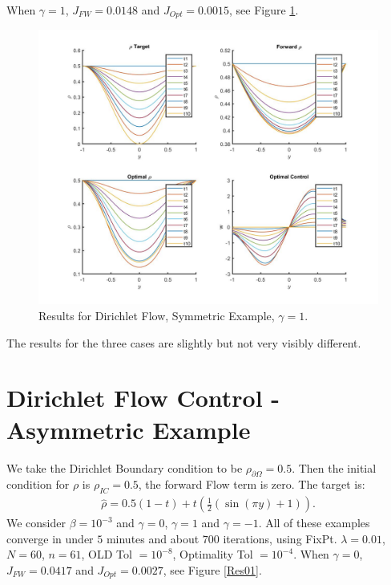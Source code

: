 \documentclass[11pt, a4paper]{article}
\theoremstyle{definition}
\begin{document}
When $\gamma = 1$, $J_{FW} = 0.0148$ and $J_{Opt} = 0.0015$, see Figure \ref{Res12}.
\begin{figure}[h]
	\includegraphics[scale=0.3]{Res12.jpg}
	\caption{Results for Dirichlet Flow, Symmetric Example, $\gamma = 1$.}
	\label{Res12}
\end{figure}
The results for the three cases are slightly but not very visibly different.
\section{Dirichlet Flow Control - Asymmetric Example}

We take the Dirichlet Boundary condition to be $\rho_{\partial \Omega} = 0.5$. Then the initial condition for $\rho$ is $\rho_{IC}=0.5$, the forward Flow term is zero. 
The target is:
\begin{align*}
\hat \rho = 0.5(1-t) + t(\frac{1}{2}(\sin(\pi y) +1)).
\end{align*}
We consider $\beta = 10^{-3}$ and $\gamma = 0$, $\gamma = 1$ and $\gamma = -1$. All of these examples converge in under $5$ minutes and about $700$ iterations, using FixPt. $\lambda = 0.01$, $N= 60$, $n = 61$, OLD Tol $= 10^{-8}$, Optimality Tol $=10^{-4}$.
When $\gamma = 0$, $J_{FW} = 0.0417$ and $J_{Opt} = 0.0027$, see Figure \ref{Res01}.
\end{document}
